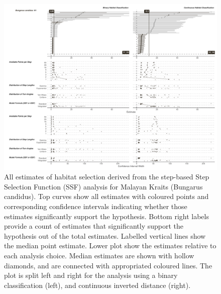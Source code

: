 \documentclass[10pt,a4paper]{article}
\begin{document}
\begin{figure}
\includegraphics[width=1\linewidth]{../../figures/specCurve_Bungarus candidus_ssf} \caption{All estimates of habitat selection derived from the step-based Step Selection Function (SSF) analysis for Malayan Kraits (Bungarus candidus). Top curves show all estimates with coloured points and corresponding confidence intervals indicating whether those estimates significantly support the hypothesis. Bottom right labels provide a count of estimates that significantly support the hypothesis out of the total estimates. Labelled vertical lines show the median point estimate. Lower plot show the estimates relative to each analysis choice. Median estimates are shown with hollow diamonds, and are connected with appropriated coloured lines. The plot is split left and right for the analysis using a binary classification (left), and continuous inverted distance (right).}\label{fig:specCurveSsfBUCA}
\end{figure}
\end{document}

